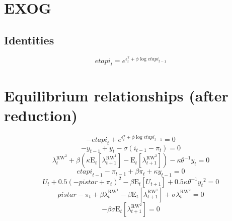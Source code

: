 \section{EXOG}

\subsection{Identities}

\begin{equation}
{e\!t\!a\!p\!i}_{t} = e^{\epsilon^{\pi}_{t} + {\phi} {\log{{e\!t\!a\!p\!i}_{t-1}}}}
\end{equation}




\section{Equilibrium relationships (after reduction)}

\begin{equation}
-{e\!t\!a\!p\!i}_{t} + e^{\epsilon^{\pi}_{t} + {\phi} {\log{{e\!t\!a\!p\!i}_{t-1}}}} = 0
\end{equation}
\begin{equation}
-y_{t-1} + y_{t} - {\sigma} \left(i_{t-1} - \pi_{t}\right) = 0
\end{equation}
\begin{equation}
\lambda^{\mathrm{RW}^{\mathrm{2}}}_{t} + {\beta} \left({\kappa} {\mathrm{E}_{t}\left[\lambda^{\mathrm{RW}^{\mathrm{1}}}_{t+1}\right]} - \mathrm{E}_{t}\left[\lambda^{\mathrm{RW}^{\mathrm{2}}}_{t+1}\right]\right) - {\kappa} {\theta}^{-1} {y_{t}} = 0
\end{equation}
\begin{equation}
{e\!t\!a\!p\!i}_{t-1} - \pi_{t-1} + {\beta} {\pi_{t}} + {\kappa} {y_{t-1}} = 0
\end{equation}
\begin{equation}
U_{t} + 0.5\left(-{p\!i\!s\!t\!a\!r} + \pi_{t}\right)^{2} - {\beta} {\mathrm{E}_{t}\left[U_{t+1}\right]} + 0.5{\kappa} {\theta}^{-1} {y_{t}}^{2} = 0
\end{equation}
\begin{equation}
{p\!i\!s\!t\!a\!r} - \pi_{t} + {\beta} {\lambda^{\mathrm{RW}^{\mathrm{1}}}_{t}} - {\beta} {\mathrm{E}_{t}\left[\lambda^{\mathrm{RW}^{\mathrm{1}}}_{t+1}\right]} + {\sigma} {\lambda^{\mathrm{RW}^{\mathrm{2}}}_{t}} = 0
\end{equation}
\begin{equation}
-{\beta} {\sigma} {\mathrm{E}_{t}\left[\lambda^{\mathrm{RW}^{\mathrm{2}}}_{t+1}\right]} = 0
\end{equation}




